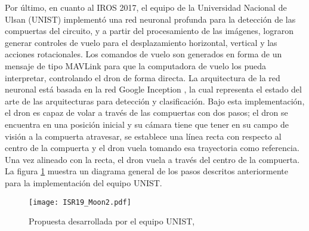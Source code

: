 Por último, en cuanto al IROS 2017, el equipo de la Universidad Nacional de Ulsan (UNIST) implementó una red neuronal profunda para la detección de las compuertas del circuito, y a partir del procesamiento de las imágenes, lograron generar controles de vuelo para el desplazamiento horizontal, vertical y las acciones rotacionales. Los comandos de vuelo son generados en forma de un mensaje de tipo MAVLink para que la computadora de vuelo los pueda interpretar, controlando el dron de forma directa.
La arquitectura de la red neuronal está basada en la red Google Inception \cite{xia2017inception}, la cual representa el estado del arte de las arquitecturas para detección y clasificación. 
Bajo esta implementación, el dron es capaz de volar a través de las compuertas con dos pasos; el dron se encuentra en una posición inicial y su cámara tiene que tener en su campo de visión a la compuerta atravesar, se establece una línea recta con respecto al centro de la compuerta y el dron vuela tomando esa trayectoria como referencia. Una vez alineado con la recta, el dron vuela a través del centro de la compuerta. La figura \ref{fig:ISR19_Moon2} muestra un diagrama general de los pasos descritos anteriormente para la implementación del equipo UNIST.

\begin{figure}[ht]
    \centering
    \texttt{[image: ISR19\_Moon2.pdf]}
    \caption{Propuesta desarrollada por el equipo UNIST, \cite{moon2019challenges}}
    \label{fig:ISR19_Moon2}
\end{figure}


